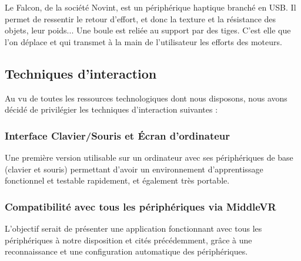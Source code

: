 Le Falcon, de la soci\'et\'e Novint, est un p\'eriph\'erique haptique branch\'e en USB. Il permet de ressentir le retour d'effort, et donc la texture et la r\'esistance des objets, leur poids... Une boule est reli\'ee au support par des tiges. C'est elle que l'on d\'eplace et qui transmet \`a la main de l'utilisateur les efforts des moteurs.
\\

\subsection{Techniques d'interaction}
Au vu de toutes les ressources technologiques dont nous disposons, nous avons d\'ecid\'e de privilégier les techniques d'interaction suivantes :

\subsubsection{Interface Clavier/Souris et \'Ecran d'ordinateur}
Une premi\`ere version utilisable sur un ordinateur avec ses p\'eriph\'eriques de base (clavier et souris) permettant d'avoir un environnement d'apprentissage fonctionnel et testable rapidement, et \'egalement tr\`es portable.

\subsubsection{Compatibilit\'e avec tous les p\'eriph\'eriques via MiddleVR}
L'objectif serait de présenter une application fonctionnant avec tous les p\'eriph\'eriques \`a notre disposition et cit\'es pr\'ec\'edemment, gr\^ace \`a une reconnaissance et une configuration automatique des p\'eriph\'eriques.
\\
